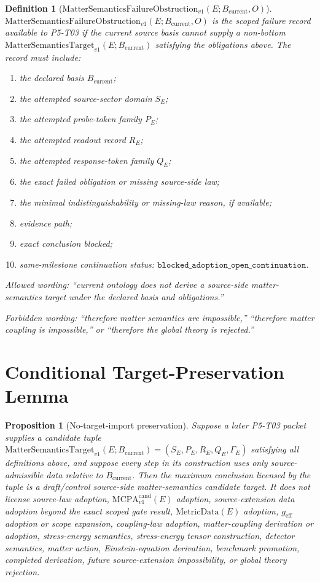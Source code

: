\documentclass[11pt]{article}
\newcommand{\MetricData}{\mathrm{MetricData}}
\newcommand{\geff}{g_{\mathrm{eff}}}
\newcommand{\MCPA}{\mathrm{MCPA}^{\mathrm{cand}}_{v1}}
\newcommand{\Bcur}{B_{\mathrm{current}}}
\newcommand{\FailureObs}{\mathrm{MatterSemanticsFailureObstruction}_{v1}}
\newcommand{\Target}{\mathrm{MatterSemanticsTarget}_{v1}}
\newtheorem{definition}{Definition}
\newtheorem{proposition}{Proposition}
\begin{document}
\begin{definition}[\(\FailureObs(E;\Bcur,O)\)]
\(\FailureObs(E;\Bcur,O)\) is the scoped failure record available to P5-T03 if
the current source basis cannot supply a non-bottom \(\Target(E;\Bcur)\)
satisfying the obligations above. The record must include:
\begin{enumerate}[leftmargin=*]
\item the declared basis \(\Bcur\);
\item the attempted source-sector domain \(S_E\);
\item the attempted probe-token family \(P_E\);
\item the attempted readout record \(R_E\);
\item the attempted response-token family \(Q_E\);
\item the exact failed obligation or missing source-side law;
\item the minimal indistinguishability or missing-law reason, if available;
\item evidence path;
\item exact conclusion blocked;
\item same-milestone continuation status:
  \(\mathtt{blocked\_adoption\_open\_continuation}\).
\end{enumerate}

Allowed wording: ``current ontology does not derive a source-side
matter-semantics target under the declared basis and obligations.''

Forbidden wording: ``therefore matter semantics are impossible,'' ``therefore
matter coupling is impossible,'' or ``therefore the global theory is
rejected.''
\end{definition}

\section{Conditional Target-Preservation Lemma}

\begin{proposition}[No-target-import preservation]
Suppose a later P5-T03 packet supplies a candidate tuple
\(\Target(E;\Bcur)=(S_E,P_E,R_E,Q_E,\Gamma_E)\) satisfying all definitions
above, and suppose every step in its construction uses only source-admissible
data relative to \(\Bcur\). Then the maximum conclusion licensed by the tuple
is a draft/control source-side matter-semantics candidate target. It does not
license source-law adoption, \(\MCPA(E)\) adoption, source-extension data
adoption beyond the exact scoped gate result, \(\MetricData(E)\) adoption,
\(\geff\) adoption or scope expansion, coupling-law adoption, matter-coupling
derivation or adoption, stress-energy semantics, stress-energy tensor
construction, detector semantics, matter action, Einstein-equation derivation,
benchmark promotion, completed derivation, future source-extension
impossibility, or global theory rejection.
\end{proposition}
\end{document}

